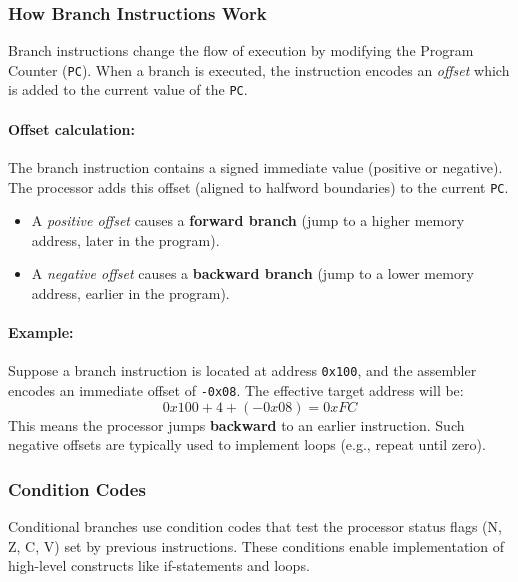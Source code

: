 \subsubsection{How Branch Instructions Work}

Branch instructions change the flow of execution by modifying the Program Counter (\texttt{PC}). 
When a branch is executed, the instruction encodes an \emph{offset} which is added to the current value of the \texttt{PC}.

\paragraph{Offset calculation:}  
The branch instruction contains a signed immediate value (positive or negative).  
The processor adds this offset (aligned to halfword boundaries) to the current \texttt{PC}.  
\begin{itemize}
    \item A \emph{positive offset} causes a \textbf{forward branch} (jump to a higher memory address, later in the program).  
    \item A \emph{negative offset} causes a \textbf{backward branch} (jump to a lower memory address, earlier in the program).  
\end{itemize} 

\paragraph{Example:}  
Suppose a branch instruction is located at address \texttt{0x100}, and the assembler encodes an immediate offset of \texttt{-0x08}.  
The effective target address will be:
\[
0x100 + 4 + (-0x08) = 0xFC
\]
This means the processor jumps \textbf{backward} to an earlier instruction.  
Such negative offsets are typically used to implement loops (e.g., repeat until zero).

\subsubsection{Condition Codes}
Conditional branches use condition codes that test the processor status flags (N, Z, C, V) set by previous instructions. These conditions enable implementation of high-level constructs like if-statements and loops.

